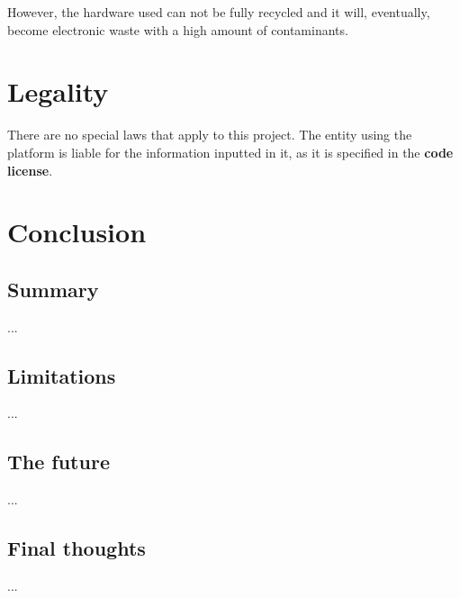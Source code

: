 \documentclass[a4paper,11pt,titlepage,abstract,numbers=noenddot,automark,mnsy,intlimits,rgb,dvipsnames]{report}
\begin{document}
However, the hardware used can not be fully recycled and it will, eventually, become electronic waste
with a high amount of contaminants.
\chapter{Legality}
There are no special laws that apply to this project. The entity using the platform
is liable for the information inputted in it, as it is specified in the \textbf{code license}.
\chapter{Conclusion}
\section{Summary}
...
\section{Limitations}
...
\section{The future}
...
\section{Final thoughts}
...


\end{document}
